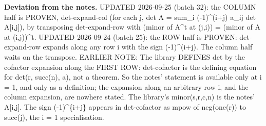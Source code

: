 \noindent\textbf{Deviation from the notes.} UPDATED 2026-09-25 (batch 32): the COLUMN half is PROVEN, det-expand-col (for each j, det A = sum\_i (-1)\textasciicircum{}(i+j) a\_ij det A[i,j]), by transposing det-expand-row with (minor of A\textasciicircum{}t at (j,i)) = (minor of A at (i,j))\textasciicircum{}t. UPDATED 2026-09-24 (batch 25): the ROW half is PROVEN: det-expand-row expands along any row i with the sign (-1)\textasciicircum{}(i+j). The column half waits on the transpose. EARLIER NOTE: The library DEFINES det by the cofactor expansion along the FIRST ROW: det-cofactor is the defining equation for det(r, succ(n), a), not a theorem.  So the notes' statement is available only at i = 1, and only as a definition; the expansion along an arbitrary row i, and the column expansion, are nowhere stated.  The library's minor(s,r,c,n) is the notes' A[i,j].  The sign (-1)\textasciicircum{}\{i+j\} appears in det-cofactor as mpow of neg(one(r)) to succ(j), the i = 1 specialisation.
%
\renewcommand{\thethm}{3.23}
\begin{cor}\label{thm:det-lower-triangular}
%
\leavevmode
{}
%
\end{cor}

